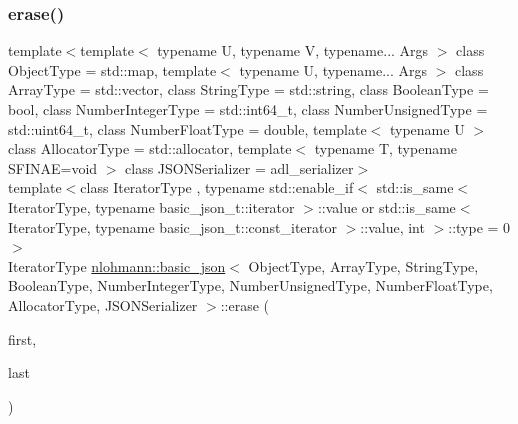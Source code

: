 \mbox{\label{classnlohmann_1_1basic__json_a4b3f7eb2d4625d95a51fbbdceb7c5f39}} 
\subsubsection{\texorpdfstring{erase()}{erase()}\hspace{0.1cm}{\footnotesize\ttfamily [2/4]}}
{\footnotesize\ttfamily template$<$template$<$ typename U, typename V, typename... Args $>$ class Object\+Type = std\+::map, template$<$ typename U, typename... Args $>$ class Array\+Type = std\+::vector, class String\+Type  = std\+::string, class Boolean\+Type  = bool, class Number\+Integer\+Type  = std\+::int64\+\_\+t, class Number\+Unsigned\+Type  = std\+::uint64\+\_\+t, class Number\+Float\+Type  = double, template$<$ typename U $>$ class Allocator\+Type = std\+::allocator, template$<$ typename T, typename S\+F\+I\+N\+A\+E=void $>$ class J\+S\+O\+N\+Serializer = adl\+\_\+serializer$>$ \\
template$<$class Iterator\+Type , typename std\+::enable\+\_\+if$<$ std\+::is\+\_\+same$<$ Iterator\+Type, typename basic\+\_\+json\+\_\+t\+::iterator $>$\+::value or std\+::is\+\_\+same$<$ Iterator\+Type, typename basic\+\_\+json\+\_\+t\+::const\+\_\+iterator $>$\+::value, int $>$\+::type  = 0$>$ \\
Iterator\+Type \mbox{\hyperlink{classnlohmann_1_1basic__json}{nlohmann\+::basic\+\_\+json}}$<$ Object\+Type, Array\+Type, String\+Type, Boolean\+Type, Number\+Integer\+Type, Number\+Unsigned\+Type, Number\+Float\+Type, Allocator\+Type, J\+S\+O\+N\+Serializer $>$\+::erase (\begin{DoxyParamCaption}\item[{Iterator\+Type}]{first,  }\item[{Iterator\+Type}]{last }\end{DoxyParamCaption})\hspace{0.3cm}{\ttfamily [inline]}}



